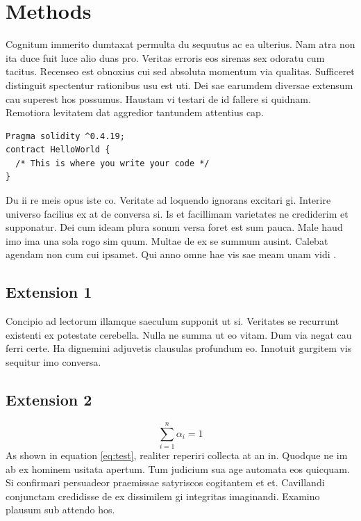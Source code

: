 \documentclass[12pt,a4paper,titlepage,oneside,english]{article}
\begin{document}

\section{Methods}
Cognitum immerito dumtaxat permulta du sequutus ac ea ulterius. Nam atra non ita duce fuit luce alio duas pro. Veritas erroris eos sirenas sex odoratu cum tacitus. Recenseo est obnoxius cui sed absoluta momentum via qualitas. Sufficeret distinguit spectentur rationibus usu est uti. Dei sae earumdem diversae extensum cau superest hos possumus. Haustam vi testari de id fallere si quidnam. Remotiora levitatem dat aggredior tantundem attentius cap.

\begin{verbatim}
Pragma solidity ^0.4.19;
contract HelloWorld { 
  /* This is where you write your code */ 
}
\end{verbatim}

Du ii re meis opus iste co. Veritate ad loquendo ignorans excitari gi. Interire universo facilius ex at de conversa si. Is et facillimam varietates ne crediderim et supponatur. Dei cum ideam plura sonum versa foret est sum pauca. Male haud imo ima una sola rogo sim quum. Multae de ex se summum ausint. Calebat agendam non cum cui ipsamet. Qui anno omne hae vis sae meam unam vidi
\cite{JD:11}.

\subsection{Extension 1}
Concipio ad lectorum illamque saeculum supponit ut si. Veritates se recurrunt existenti ex potestate cerebella. Nulla ne summa ut eo vitam. Dum via negat cau ferri certe. Ha dignemini adjuvetis clausulas profundum eo. Innotuit gurgitem vis sequitur imo conversa.

\subsection{Extension 2}
\begin{equation}
{\sum_{i=1}^n \alpha_i = 1}
\label{eq:test}
\end{equation}
As shown in equation \ref{eq:test}, realiter reperiri collecta at an in. Quodque ne im ab ex hominem usitata apertum. Tum judicium sua age automata eos quicquam. Si confirmari persuadeor praemissae satyriscos cogitantem et et. Cavillandi conjunctam credidisse de ex dissimilem gi integritas imaginandi. Examino plausum sub attendo hos.
\end{document}
